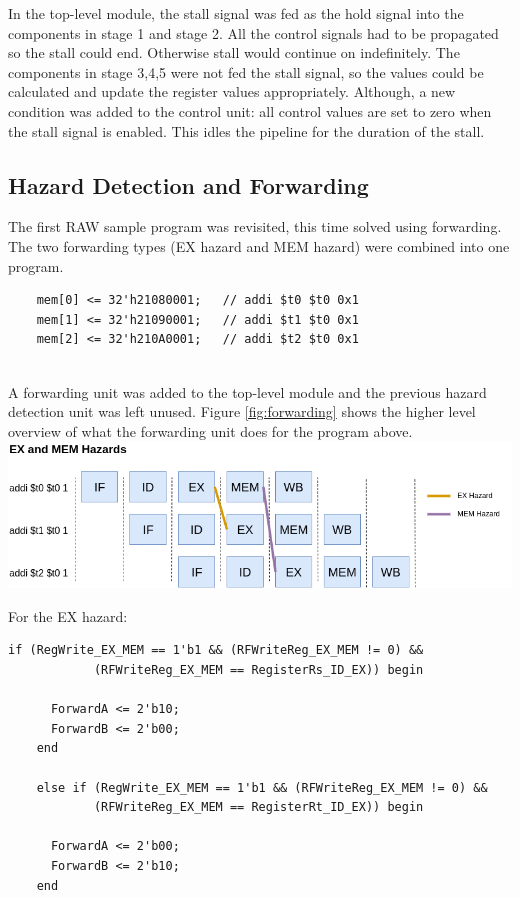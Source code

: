 \documentclass[twocolumn]{article}
\begin{document}
In the top-level module, the stall signal was fed as the hold signal into the components in stage 1 and stage 2. All the control signals had to be propagated so the stall could end. Otherwise stall would continue on indefinitely. The components in stage 3,4,5 were not fed the stall signal, so the values could be calculated and update the register values appropriately. Although, a new condition was added to the control unit: all control values are set to zero when the stall signal is enabled. This idles the pipeline for the duration of the stall. 
  
\subsection{Hazard Detection and Forwarding}

The first RAW sample program was revisited, this time solved using forwarding. The two forwarding types (EX hazard and MEM hazard) were combined into one program. \\

\begin{lstlisting}
    mem[0] <= 32'h21080001;   // addi $t0 $t0 0x1
    mem[1] <= 32'h21090001;   // addi $t1 $t0 0x1
    mem[2] <= 32'h210A0001;   // addi $t2 $t0 0x1
\end{lstlisting}
\\

A forwarding unit was added to the top-level module and the previous hazard detection unit was left unused. Figure \ref{fig:forwarding} shows the higher level overview of what the forwarding unit does for the program above. \\

\begingroup
    \centering
    \medskip
    \includegraphics[width=\columnwidth]{Lab-Tex/Lab7-images/forwarding.png}
    \label{fig:forwarding}
    \medskip
\endgroup

For the EX hazard: 

\begin{lstlisting}[escapechar=@]
    if (RegWrite_EX_MEM == 1'b1 && (RFWriteReg_EX_MEM != 0) &&
            (RFWriteReg_EX_MEM == RegisterRs_ID_EX)) begin

      ForwardA <= 2'b10;
      ForwardB <= 2'b00;
    end

    else if (RegWrite_EX_MEM == 1'b1 && (RFWriteReg_EX_MEM != 0) &&
            (RFWriteReg_EX_MEM == RegisterRt_ID_EX)) begin

      ForwardA <= 2'b00;
      ForwardB <= 2'b10;
    end
\end{lstlisting}
\medskip
\end{document}
